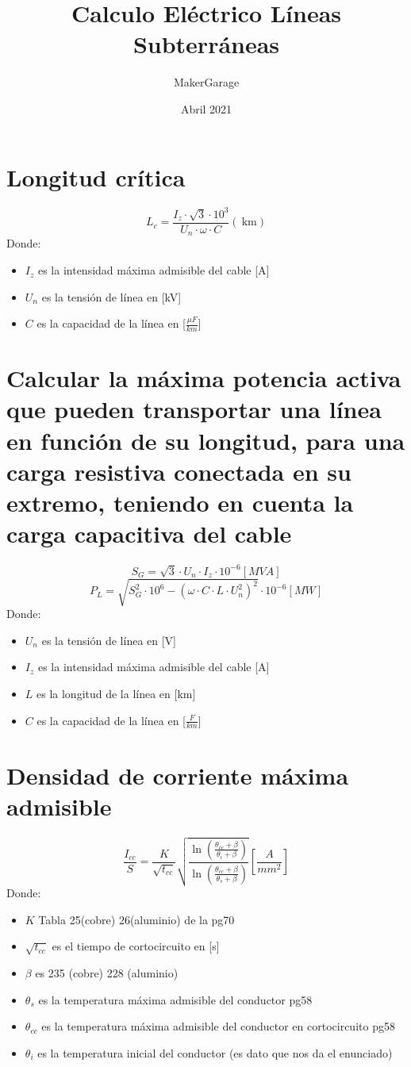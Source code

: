 \documentclass[10pt,a4paper]{article}
\title{Calculo Eléctrico Líneas Subterráneas}
\author{MakerGarage}
\date{Abril 2021}
\begin{document}
\maketitle
\newpage
\tableofcontents
\newpage

\section{Longitud crítica}
$$
L_{c}=\frac{I_{z} \cdot \sqrt{3} \cdot 10^{3}}{U_{n} \cdot \omega \cdot C}(\mathrm{~km})
$$
Donde:
\begin{itemize}
    \item $I_z$ es la intensidad máxima admisible del cable [A]
    \item $U_n$ es la tensión de línea en [kV]
    \item $C$ es la capacidad de la línea en [$\frac{\mu F}{km}$]
\end{itemize}

\section{Calcular la máxima potencia activa que pueden transportar una línea en función de su longitud, para una carga resistiva conectada en su extremo, teniendo en cuenta la carga capacitiva del cable}
$$
S_{G}=\sqrt{3} \cdot U_{n} \cdot I_{z} \cdot 10^{-6} [MVA]
$$
$$
P_{L}=\sqrt{S_{G}^{2} \cdot 10^6 -\left(\omega \cdot C \cdot L \cdot U_{n}^{2}\right)^{2}} \cdot 10^{-6} [MW]
$$
Donde:
\begin{itemize}
    \item $U_n$ es la tensión de línea en [V]
    \item $I_z$ es la intensidad máxima admisible del cable [A]
    \item $L$ es la longitud de la línea en [km]
    \item $C$ es la capacidad de la línea en [$\frac{F}{km}$]
\end{itemize}

\section{Densidad de corriente máxima admisible}
$$
\frac{I_{c c}}{S}=\frac{K}{\sqrt{t_{c c}}} \sqrt{\frac{\ln \left(\frac{\theta_{c c}+\beta}{\theta_{i}+\beta}\right)}{\ln \left(\frac{\theta_{c c}+\beta}{\theta_{s}+\beta}\right)}} [\frac{A}{mm^2}]
$$
Donde:
\begin{itemize}
    \item $K$ Tabla 25(cobre) 26(aluminio) de la pg70
    \item $\sqrt{t_{c c}}$ es el tiempo de cortocircuito en [s]
    \item $\beta$ es 235 (cobre) 228 (aluminio)
    \item $\theta_{s}$ es la temperatura máxima admisible del conductor pg58
    \item $\theta_{cc}$ es la temperatura máxima admisible del conductor en cortocircuito pg58
    \item $\theta_{i}$ es la temperatura inicial del conductor (es dato que nos da el enunciado)
\end{itemize}
\newpage
\end{document}
